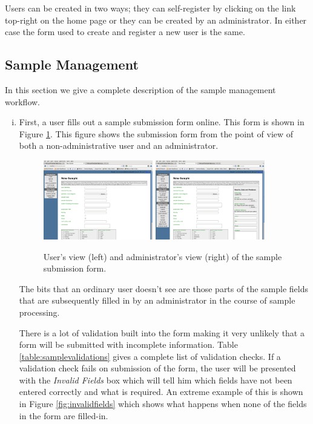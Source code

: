 \documentclass[12pt,twoside]{article}
\begin{document}
Users can be created in two ways; they can self-register by clicking
on the link top-right on the home page or they can be created by an
administrator. In either case the form used to create and register a new
user is the same.

\subsection{Sample Management}

In this section we give a complete description of the sample management
workflow.
\begin{enumerate}[(i)]
\item
First, a user fills out a sample submission form online. This form is
shown in Figure \ref{fig:sampleform}. This figure shows the
submission form from the point of view of both a non-administrative user
and an administrator.
\begin{figure}[!h]
\begin{center}
\includegraphics[width=0.45\textwidth]{sampleformuser}
\quad
\includegraphics[width=0.45\textwidth]{sampleformadmin}
\caption{User's view (left) and administrator's view (right)
of the sample submission form.\label{fig:sampleform}}
\end{center}
\end{figure}

The bits that an ordinary user doesn't see are those parts of the sample
fields that are subsequently filled in by an administrator in the course
of sample processing.

There is a lot of validation built into the form making it very unlikely
that a form will be submitted with incomplete information.
Table \ref{table:samplevalidations} gives a complete list of
validation checks. If a validation check fails on submission of the form,
the user will be presented with the \emph{Invalid Fields} box which will
tell him which fields have not been entered correctly and what is
required. An extreme example of this is shown in Figure
\ref{fig:invalidfields} which shows what happens when none of the fields
in the form are filled-in.


\end{enumerate}
\end{document}
